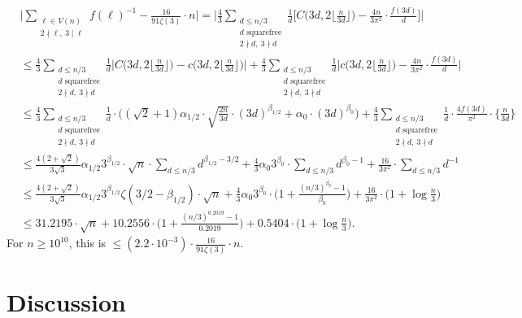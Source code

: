 \documentclass{article}
\theoremstyle{plain}
\theoremstyle{definition}
\theoremstyle{remark}
\begin{document}
\begin{align*}
&\bigg|\sum_{\substack{\ell\in V(n)\\2\nmid\ell,~3\mid\ell}}f(\ell)^{-1}-\frac{16}{91\zeta(3)}\cdot n\bigg|
=\bigg|\frac{4}{3}\sum_{\substack{d\leq n/3\\d\text{ squarefree}\\2\nmid d,~3\nmid d}}\frac{1}{d}\bigg[
C\bigg(3d,2\bigg\lfloor\frac{n}{3d}\bigg\rfloor\bigg)
-\frac{4n}{3\pi^2}\cdot \frac{f(3d)}{d}
\bigg]\bigg|\\
&\leq\frac{4}{3}\sum_{\substack{d\leq n/3\\d\text{ squarefree}\\2\nmid d,~3\nmid d}}\frac{1}{d}\bigg|
C\bigg(3d,2\bigg\lfloor\frac{n}{3d}\bigg\rfloor\bigg)
-c\bigg(3d,2\bigg\lfloor\frac{n}{3d}\bigg\rfloor\bigg)\bigg|
+\frac{4}{3}\sum_{\substack{d\leq n/3\\d\text{ squarefree}\\2\nmid d,~3\nmid d}}\frac{1}{d}\bigg|c\bigg(3d,2\bigg\lfloor\frac{n}{3d}\bigg\rfloor\bigg)-\frac{4n}{3\pi^2}\cdot \frac{f(3d)}{d}
\bigg|\\
&\leq\frac{4}{3}\sum_{\substack{d\leq n/3\\d\text{ squarefree}\\2\nmid d,~3\nmid d}}\frac{1}{d}\cdot\bigg((\sqrt{2}+1)\alpha_{1/2}\cdot \sqrt{\frac{2n}{3d}}\cdot (3d)^{\beta_{1/2}}+\alpha_{0}\cdot(3d)^{\beta_{0}}\bigg)
+\frac{4}{3}\sum_{\substack{d\leq n/3\\d\text{ squarefree}\\2\nmid d,~3\nmid d}}\frac{1}{d}\cdot\frac{4f(3d)}{\pi^2}\cdot \bigg\{\frac{n}{3d}\bigg\}\\
&\leq\frac{4(2+\sqrt{2})}{3\sqrt{3}}\alpha_{1/2}3^{\beta_{1/2}}\cdot\sqrt{n}\cdot\sum_{d\leq n/3}d^{\beta_{1/2}-3/2}
+\frac{4}{3}\alpha_{0}3^{\beta_{0}}\cdot\sum_{d\leq n/3}d^{\beta_{0}-1}
+\frac{16}{3\pi^2}\cdot\sum_{d\leq n/3}d^{-1}\\
&\leq\frac{4(2+\sqrt{2})}{3\sqrt{3}}\alpha_{1/2}3^{\beta_{1/2}}\zeta(3/2-\beta_{1/2})\cdot\sqrt{n}
+\frac{4}{3}\alpha_{0}3^{\beta_{0}}\cdot\bigg(1+\frac{(n/3)^{\beta_{0}}-1}{\beta_{0}}\bigg)
+\frac{16}{3\pi^2}\cdot\bigg(1+\log \frac{n}{3}\bigg)\\
&\leq31.2195\cdot\sqrt{n}
+10.2556\cdot\bigg(1+\frac{(n/3)^{0.2019}-1}{0.2019}\bigg)
+0.5404\cdot\bigg(1+\log \frac{n}{3}\bigg).
\end{align*}
For $n\geq10^{10}$, this is $\leq (2.2\cdot 10^{-3})\cdot \frac{16}{91\zeta(3)}\cdot n$.

\section{Discussion}
\label{sec.discussion}
\end{document}
